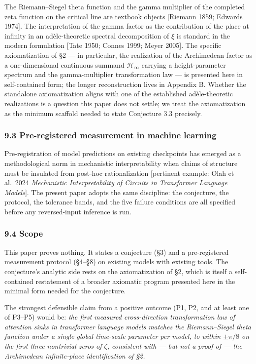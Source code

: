 \documentclass[
  letterpaper,
  11pt]{article}
\theoremstyle{plain}
\theoremstyle{definition}
\theoremstyle{remark}
\begin{document}
The Riemann--Siegel theta function and the gamma multiplier of the completed zeta function on the critical line are textbook objects {[}Riemann 1859; Edwards 1974{]}. The interpretation of the gamma factor as the contribution of the place at infinity in an adèle-theoretic spectral decomposition of \(\xi\) is standard in the modern formulation {[}Tate 1950; Connes 1999; Meyer 2005{]}. The specific axiomatization of §2 --- in particular, the realization of the Archimedean factor as a one-dimensional continuous summand \(\mathcal{H}_\infty\) carrying a height-parameter spectrum and the gamma-multiplier transformation law --- is presented here in self-contained form; the longer reconstruction lives in Appendix B. Whether the standalone axiomatization aligns with one of the established adèle-theoretic realizations is a question this paper does not settle; we treat the axiomatization as the minimum scaffold needed to state Conjecture 3.3 precisely.

\subsubsection{9.3 Pre-registered measurement in machine learning}\label{pre-registered-measurement-in-machine-learning}

Pre-registration of model predictions on existing checkpoints has emerged as a methodological norm in mechanistic interpretability when claims of structure must be insulated from post-hoc rationalization {[}pertinent example: Olah et al.~2024 \emph{Mechanistic Interpretability of Circuits in Transformer Language Models}{]}. The present paper adopts the same discipline: the conjecture, the protocol, the tolerance bands, and the five failure conditions are all specified before any reversed-input inference is run.

\subsubsection{9.4 Scope}\label{scope}

This paper proves nothing. It states a conjecture (§3) and a pre-registered measurement protocol (§4--§8) on existing models with existing tools. The conjecture's analytic side rests on the axiomatization of §2, which is itself a self-contained restatement of a broader axiomatic program presented here in the minimal form needed for the conjecture.

The strongest defensible claim from a positive outcome (P1, P2, and at least one of P3--P5) would be: \emph{the first measured cross-direction transformation law of attention sinks in transformer language models matches the Riemann--Siegel theta function under a single global time-scale parameter per model, to within \(\pm \pi/8\) on the first three nontrivial zeros of \(\zeta\), consistent with --- but not a proof of --- the Archimedean infinite-place identification of §2.}
\end{document}
